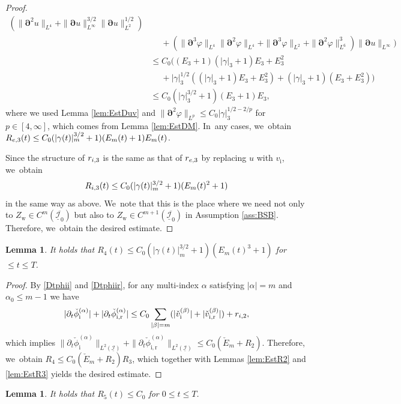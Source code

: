 \documentclass[11pt]{article}
\newcommand{\dt}{\partial_t}
\newcommand{\cI}{{\mathcal I}}
\newcommand{\ul}[1]{\underline{#1}}
\newtheorem{lemma}[theorem]{Lemma}
\theoremstyle{definition}
\begin{document}
\begin{proof}
\begin{align*}
(\|\bm{\partial}^2u\|_{L^4} + \|\bm{\partial}u\|_{L^\infty}^{3/2}\|\bm{\partial}u\|_{L^2}^{1/2}) \\
&\quad\;
+ (\|\bm{\partial}^3\varphi\|_{L^4}\|\bm{\partial}^2\varphi\|_{L^4} + \|\bm{\partial}^3\varphi\|_{L^2} + \|\bm{\partial}^2\varphi\|_{L^6}^3)
\|\bm{\partial}u\|_{L^\infty} \Bigr) \\
&\leq C_0 \bigl((E_3+1)(|\gamma|_3+1)E_3 + E_3^2 \\
&\quad\;
+ |\gamma|_3^{1/2}((|\gamma|_3+1)E_3 + E_3^2) + (|\gamma|_3+1)(E_3 + E_3^2) \bigr) \\
&\leq C_0(|\gamma|_3^{3/2}+1)(E_3+1)E_3,
\end{align*}
where we used Lemma \ref{lem:EstDuv} and $\|\bm{\partial}^2\varphi\|_{L^p} \leq C_0|\gamma|_3^{1/2-2/p}$ for $p\in[4,\infty]$,
which comes from Lemma \ref{lem:EstDM}. In~any cases, we~obtain $R_{{\rm e},3}(t) \leq C_0(|\gamma(t)|_m^{3/2}+1)(E_m(t)+1)E_m(t)$.

Since the structure of $r_{{\rm i},3}$ is the same as that of $r_{{\rm e},3}$ by replacing $u$ with $v_\mathrm{i}$, we~obtain
\[
R_{{\rm i},3}(t) \leq C_0(|\gamma(t)|_m^{3/2}+1)(E_m(t)^2+1)
\]
in the same way as above. We~note that this is the place where we need not only to $Z_\mathrm{w}\in C^m(\overline{\ul{\cI}_0})$
but also to $Z_\mathrm{w}\in C^{m+1}(\overline{\ul{\cI}_0})$ in Assumption \ref{ass:BSB}.
Therefore, we~obtain the desired estimate.
\end{proof}

\begin{lemma}\label{lem:EstR4}
It holds that $R_4(t) \leq C_0(|\gamma(t)|_m^{3/2}+1)(E_m(t)^3+1)$ for $\leq t\leq T$.
\end{lemma}

\begin{proof}
By \eqref{Dtphii} and \eqref{Dtphiir}, for any multi-index $\alpha$ satisfying $|\alpha|=m$ and $\alpha_0\leq m-1$ we have
\[
|\dt\check{\phi}_\mathrm{i}^{(\alpha)}| + |\dt\check{\phi}_\mathrm{i,r}^{(\alpha)}|
\leq C_0\sum_{|\beta|=m} (|\check{v}_\mathrm{i}^{(\beta)}| + |\check{v}_\mathrm{i,r}^{(\beta)}|) + r_{{\rm i},2},
\]
which implies
$\|\dt\check{\phi}_\mathrm{i}^{(\alpha)}\|_{L^2(\ul{\cI})} + \|\dt\check{\phi}_\mathrm{i,r}^{(\alpha)}\|_{L^2(\ul{\cI})}\leq C_0(\check{E}_m + R_2)$.
Therefore, we~obtain $R_4 \leq C_0 (\check{E}_m + R_2)R_3$, which together with Lemmas \ref{lem:EstR2} and \ref{lem:EstR3} yields the desired estimate.
\end{proof}

\begin{lemma}\label{lem:EstR5}
It holds that $R_5(t) \leq C_0$ for $0\leq t\leq T$.
\end{lemma}
\end{document}
